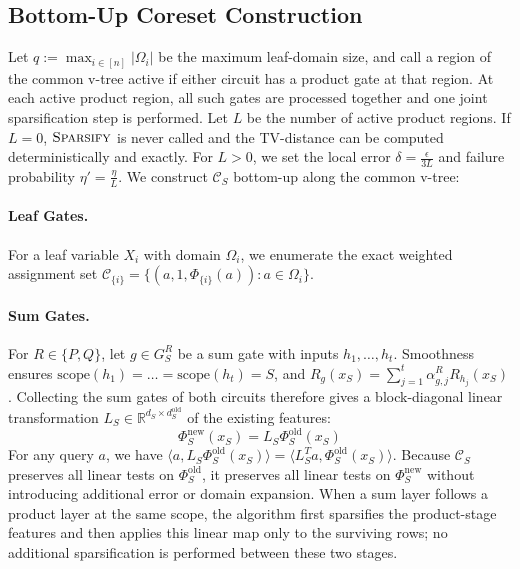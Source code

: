 \documentclass{article}
\begin{document}
\subsection{Bottom-Up Coreset Construction}
Let $q:=\max_{i\in[n]}|\Omega_i|$ be the maximum leaf-domain size, and call a region of the common v-tree active if either circuit has a product gate at that region. At each active product region, all such gates are processed together and one joint sparsification step is performed. Let $L$ be the number of active product regions. If $L=0$, $\textsc{Sparsify}$ is never called and the TV-distance can be computed deterministically and exactly. For $L>0$, we set the local error $\delta = \frac{\epsilon}{3L}$ and failure probability $\eta' = \frac{\eta}{L}$. We construct $\mathcal{C}_S$ bottom-up along the common v-tree:

\paragraph{Leaf Gates.} For a leaf variable $X_i$ with domain $\Omega_i$, we enumerate the exact weighted assignment set $\mathcal{C}_{\{i\}} = \{(a, 1, \Phi_{\{i\}}(a)) : a \in \Omega_i\}$.

\paragraph{Sum Gates.} For $R\in\{P,Q\}$, let $g\in G_S^R$ be a sum gate with inputs $h_1,\dots,h_t$. Smoothness ensures $\mathrm{scope}(h_1)=\dots=\mathrm{scope}(h_t)=S$, and $R_g(x_S)=\sum_{j=1}^t\alpha_{g,j}^R R_{h_j}(x_S)$. Collecting the sum gates of both circuits therefore gives a block-diagonal linear transformation $L_S \in \mathbb{R}^{d_S \times d_S^{\mathrm{old}}}$ of the existing features:
\begin{equation*}
    \Phi_S^{\mathrm{new}}(x_S) = L_S \Phi_S^{\mathrm{old}}(x_S)
\end{equation*}
For any query $a$, we have $\langle a, L_S \Phi_S^{\mathrm{old}}(x_S) \rangle = \langle L_S^T a, \Phi_S^{\mathrm{old}}(x_S) \rangle$. Because $\mathcal{C}_S$ preserves all linear tests on $\Phi_S^{\mathrm{old}}$, it preserves all linear tests on $\Phi_S^{\mathrm{new}}$ without introducing additional error or domain expansion. When a sum layer follows a product layer at the same scope, the algorithm first sparsifies the product-stage features and then applies this linear map only to the surviving rows; no additional sparsification is performed between these two stages.
\end{document}
